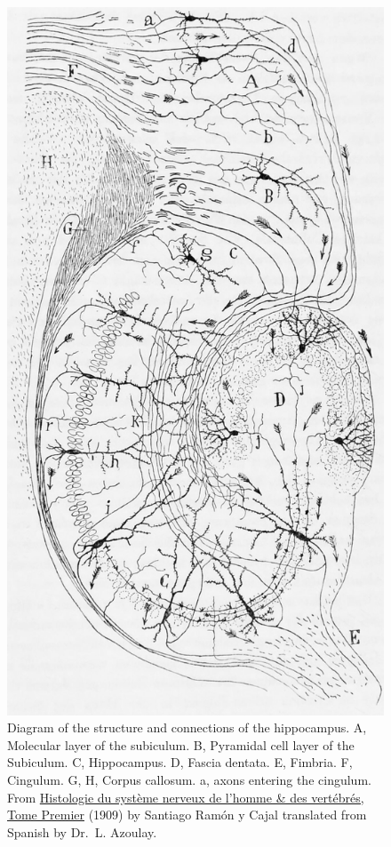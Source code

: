 \begin{figure}

{\centering \includegraphics[width=0.7\linewidth]{./figures/cns/CajalHippocampus} 

}

\caption{Diagram of the structure and connections of the hippocampus. A, Molecular layer of the subiculum. B, Pyramidal cell layer of the Subiculum. C, Hippocampus. D, Fascia dentata. E, Fimbria. F, Cingulum. G, H, Corpus callosum. a, axons entering the cingulum. From \href{https://wellcomelibrary.org/item/b2129592x\#?c=0\&m=0\&s=0\&cv=14\&z=0\%2C-3.48\%2C1\%2C8.6591}{Histologie du système nerveux de l'homme \& des vertébrés, Tome Premier} (1909) by Santiago Ramón y Cajal translated from Spanish by Dr.~L. Azoulay.}\label{fig:hippocircuit}
\end{figure}

